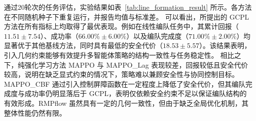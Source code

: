 通过20轮次的任务评估，实验结果如表~\ref{tab:line_formation_result} 所示。各方法在不同随机种子下重复运行，并报告均值与标准差。
可以看出，所提出的 GCPL 方法在所有指标上均取得了最优表现。例如在线性编队任务中，其累计回报（$11.51 \pm 7.54$）、成功率（$66.00\% \pm 6.00\%$）以及编队完成度（$71.00\% \pm 2.00\%$）均显著优于其他基线方法，同时具有最低的安全代价（$18.53 \pm 5.57$）。该结果表明，引入几何约束能够有效提升多智能体策略的结构一致性与任务稳定性。
相比之下，纯强化学习方法 MAPPO 与 MAPPO\_Lag 表现较差，回报较低且安全代价较高，说明在缺乏显式约束的情况下，策略难以兼顾安全性与协同控制目标。MAPPO\_CBF 通过引入控制屏障函数在一定程度上降低了安全代价，但其编队完成度与成功率仍明显落后于 GCPL，表明仅依赖安全约束不足以保证编队结构的有效形成。RMPflow 虽然具有一定的几何一致性，但由于缺乏全局优化机制，其整体性能仍然有限。

\begin{table}[htbp]
    \centering
    \label{tab:line_formation_result}
\end{table}

